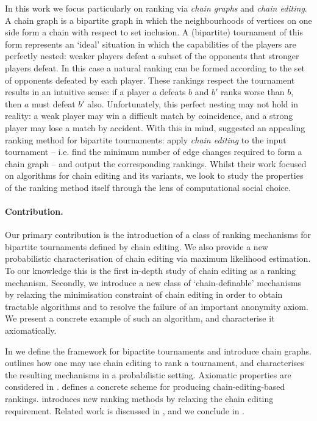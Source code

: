 In this work we focus particularly on ranking via \emph{chain graphs} and
\emph{chain editing}. A chain graph is a bipartite graph in which the
neighbourhoods of vertices on one side form a chain with respect to set
inclusion. A (bipartite) tournament of this form represents an `ideal'
situation in which the capabilities of the players are perfectly nested: weaker
players defeat a subset of the opponents that stronger players defeat. In this
case a natural ranking can be formed according to the set of opponents defeated
by each player. These rankings respect the tournament results in an intuitive
sense: if a player $a$ defeats $b$ and $b'$ ranks worse than $b$, then $a$ must
defeat $b'$ also.
%
Unfortunately, this perfect nesting may not hold in reality: a weak player may
win a difficult match by coincidence, and a strong player may lose a match by
accident.
%
With this in mind, \textcite{jiao2017algorithms} suggested an appealing ranking
method for bipartite tournaments: apply \emph{chain editing} to the input
tournament -- i.e. find the minimum number of edge changes required to form a
chain graph -- and output the corresponding rankings. Whilst their work
focused on algorithms for chain editing and its variants, we look to study the
properties of the ranking method itself through the lens of computational social
choice.

\paragraph{Contribution.} Our primary contribution is the introduction of a
class of ranking mechanisms for bipartite tournaments defined by chain editing.
We also provide a new probabilistic characterisation of chain editing via
maximum likelihood estimation. To our knowledge this is the first in-depth
study of chain editing as a ranking mechanism. Secondly, we introduce a new
class of `chain-definable' mechanisms by relaxing the minimisation constraint
of chain editing in order to obtain tractable algorithms and to resolve the
failure of an important anonymity axiom. We present a concrete example of such
an algorithm, and characterise it axiomatically.

\begin{chapteroutline}
    In  we define the framework for bipartite
    tournaments and introduce chain graphs.
     outlines how one may use chain
    editing to rank a tournament, and characterises the resulting mechanisms in
    a probabilistic setting. Axiomatic properties are considered in
    .
     defines a concrete scheme for
    producing chain-editing-based rankings.
     introduces new ranking methods by
    relaxing the chain editing requirement. Related work is discussed in
    , and we conclude in
    .
\end{chapteroutline}

